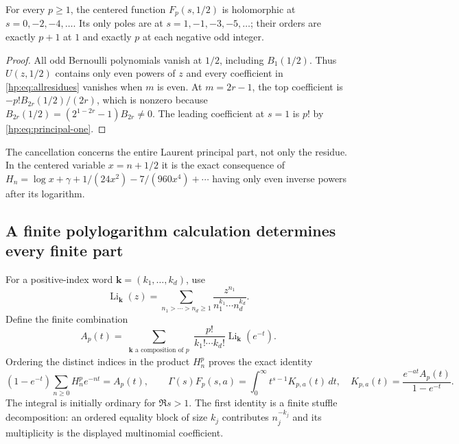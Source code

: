\begin{corollary}
\label{hp:cor:centered}
For every $p\ge1$, the centered function $F_p(s,1/2)$ is holomorphic
at $s=0,-2,-4,\ldots$. Its only poles are at
$s=1,-1,-3,-5,\ldots$; their orders are exactly $p+1$ at $1$ and
exactly $p$ at each negative odd integer.
\end{corollary}
\begin{proof}
All odd Bernoulli polynomials vanish at $1/2$, including $B_1(1/2)$.
Thus $U(z,1/2)$ contains only even powers of $z$ and every coefficient
in \eqref{hp:eq:allresidues} vanishes when $m$ is even.
At $m=2r-1$, the top coefficient is
$-p!B_{2r}(1/2)/(2r)$, which is nonzero because
$B_{2r}(1/2)=(2^{1-2r}-1)B_{2r}\ne0$. The leading coefficient at
$s=1$ is $p!$ by \eqref{hp:eq:principal-one}.
\end{proof}

The cancellation concerns the entire Laurent principal part, not only
the residue. In the centered variable $x=n+1/2$ it is the exact
consequence of
$H_n=\log x+\gamma+1/(24x^2)-7/(960x^4)+\cdots$ having only even
inverse powers after its logarithm.

\subsection{A finite polylogarithm calculation determines every finite part}

For a positive-index word $\boldsymbol{k}=(k_1,\ldots,k_d)$, use
\[
 \operatorname{Li}_{\boldsymbol{k}}(z)
 =\sum_{n_1>\cdots>n_d\ge1}
       \frac{z^{n_1}}{n_1^{k_1}\cdots n_d^{k_d}}.
\]
Define the finite combination
\begin{equation}\label{hp:def:A}
 A_p(t)=\sum_{\substack{\boldsymbol{k}\text{ a composition of }p}}
     \frac{p!}{k_1!\cdots k_d!}
                  \operatorname{Li}_{\boldsymbol{k}}(e^{-t}).
\end{equation}
Ordering the distinct indices in the product $H_n^p$ proves the exact
identity
\begin{equation}\label{hp:eq:kernel}
 (1-e^{-t})\sum_{n\ge0}H_n^pe^{-nt}=A_p(t),\qquad
 \Gamma(s)F_p(s,a)=\int_0^\infty t^{s-1}K_{p,a}(t)\,dt,
 \quad K_{p,a}(t)=\frac{e^{-at}A_p(t)}{1-e^{-t}}.
\end{equation}
The integral is initially ordinary for $\Re s>1$. The first identity
is a finite stuffle decomposition: an ordered equality block of size
$k_j$ contributes $n_j^{-k_j}$ and its multiplicity is the displayed
multinomial coefficient.


